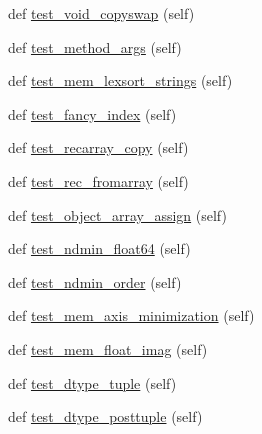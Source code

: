 \begin{DoxyCompactItemize}
\item 
def \hyperlink{classnumpy_1_1core_1_1tests_1_1test__regression_1_1TestRegression_ad87e40f897587de3024b415b5e7e2953}{test\+\_\+void\+\_\+copyswap} (self)
\item 
def \hyperlink{classnumpy_1_1core_1_1tests_1_1test__regression_1_1TestRegression_a3bf0eb506001afc0e6ab051395ddaff0}{test\+\_\+method\+\_\+args} (self)
\item 
def \hyperlink{classnumpy_1_1core_1_1tests_1_1test__regression_1_1TestRegression_a0f4b5516e1e4ed0e51031a4b2735672d}{test\+\_\+mem\+\_\+lexsort\+\_\+strings} (self)
\item 
def \hyperlink{classnumpy_1_1core_1_1tests_1_1test__regression_1_1TestRegression_a659b0000c07b09f8446b93cc6335d9d9}{test\+\_\+fancy\+\_\+index} (self)
\item 
def \hyperlink{classnumpy_1_1core_1_1tests_1_1test__regression_1_1TestRegression_ab8b86c12c163a134e3bb5e1d10683a41}{test\+\_\+recarray\+\_\+copy} (self)
\item 
def \hyperlink{classnumpy_1_1core_1_1tests_1_1test__regression_1_1TestRegression_a606b9b06607698f5363ae352a25947be}{test\+\_\+rec\+\_\+fromarray} (self)
\item 
def \hyperlink{classnumpy_1_1core_1_1tests_1_1test__regression_1_1TestRegression_a8a49d469f0c5fe3ace9d7bdad2074851}{test\+\_\+object\+\_\+array\+\_\+assign} (self)
\item 
def \hyperlink{classnumpy_1_1core_1_1tests_1_1test__regression_1_1TestRegression_ade34931b5ae5c6c7ba376d2af955ad7e}{test\+\_\+ndmin\+\_\+float64} (self)
\item 
def \hyperlink{classnumpy_1_1core_1_1tests_1_1test__regression_1_1TestRegression_a0b91623299b63e329d611b762c9e4a9b}{test\+\_\+ndmin\+\_\+order} (self)
\item 
def \hyperlink{classnumpy_1_1core_1_1tests_1_1test__regression_1_1TestRegression_a421406ffb1e443d91233923fe6e87a8c}{test\+\_\+mem\+\_\+axis\+\_\+minimization} (self)
\item 
def \hyperlink{classnumpy_1_1core_1_1tests_1_1test__regression_1_1TestRegression_ac2addf2628029fd894051c30dbc4f639}{test\+\_\+mem\+\_\+float\+\_\+imag} (self)
\item 
def \hyperlink{classnumpy_1_1core_1_1tests_1_1test__regression_1_1TestRegression_aa362de40520e3d0f8cc738c73a66d6ab}{test\+\_\+dtype\+\_\+tuple} (self)
\item 
def \hyperlink{classnumpy_1_1core_1_1tests_1_1test__regression_1_1TestRegression_aab26d7fdfa5c937e93874906568cde3e}{test\+\_\+dtype\+\_\+posttuple} (self)

\end{DoxyCompactItemize}
